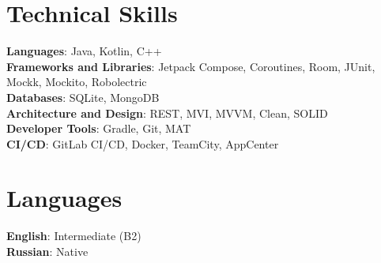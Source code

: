 \documentclass[letterpaper,11pt]{article}
\begin{document}
%
\section{Technical Skills}
 \begin{itemize}[leftmargin=0.15in, label={}]
    \small{\item{
     \textbf{Languages}{: Java, Kotlin, C++} \\
     \textbf{Frameworks and Libraries}{: Jetpack Compose, Coroutines, Room, JUnit, Mockk, Mockito, Robolectric } \\
     \textbf{Databases}{: SQLite, MongoDB } \\
     \textbf{Architecture and Design}{: REST, MVI, MVVM, Clean, SOLID } \\
     \textbf{Developer Tools}{: Gradle, Git, MAT } \\
     \textbf{CI/CD}{: GitLab CI/CD, Docker, TeamCity, AppCenter} \\
    }}
 \end{itemize}


\section{Languages}
 \begin{itemize}[leftmargin=0.15in, label={}]
    \small{\item{
     \textbf{English}{: Intermediate (B2)} \\
     \textbf{Russian}{: Native}
    }}
 \end{itemize}

\end{document}
